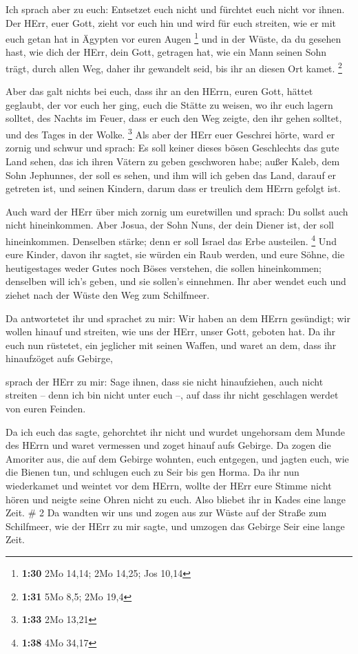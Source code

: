  Ich sprach aber zu euch: Entsetzet euch nicht und fürchtet
euch nicht vor ihnen.  Der HErr, euer Gott, zieht vor euch
hin und wird für euch streiten, wie er mit euch getan hat in Ägypten vor
euren Augen \footnote{\textbf{1:30} 2Mo 14,14; 2Mo 14,25; Jos 10,14}
 und in der Wüste, da du gesehen hast, wie dich der HErr,
dein Gott, getragen hat, wie ein Mann seinen Sohn trägt, durch allen
Weg, daher ihr gewandelt seid, bis ihr an diesen Ort kamet. \footnote{\textbf{1:31}
  5Mo 8,5; 2Mo 19,4}

 Aber das galt nichts bei euch, dass ihr an den HErrn,
euren Gott, hättet geglaubt,  der vor euch her ging, euch
die Stätte zu weisen, wo ihr euch lagern solltet, des Nachts im Feuer,
dass er euch den Weg zeigte, den ihr gehen solltet, und des Tages in der
Wolke. \footnote{\textbf{1:33} 2Mo 13,21}  Als aber der
HErr euer Geschrei hörte, ward er zornig und schwur und sprach:
 Es soll keiner dieses bösen Geschlechts das gute Land
sehen, das ich ihren Vätern zu geben geschworen habe; 
außer Kaleb, dem Sohn Jephunnes, der soll es sehen, und ihm will ich
geben das Land, darauf er getreten ist, und seinen Kindern, darum dass
er treulich dem HErrn gefolgt ist.

 Auch ward der HErr über mich zornig um euretwillen und
sprach: Du sollst auch nicht hineinkommen.  Aber Josua, der
Sohn Nuns, der dein Diener ist, der soll hineinkommen. Denselben stärke;
denn er soll Israel das Erbe austeilen. \footnote{\textbf{1:38} 4Mo
  34,17}  Und eure Kinder, davon ihr sagtet, sie würden ein
Raub werden, und eure Söhne, die heutigestages weder Gutes noch Böses
verstehen, die sollen hineinkommen; denselben will ich's geben, und sie
sollen's einnehmen.  Ihr aber wendet euch und ziehet nach
der Wüste den Weg zum Schilfmeer.

 Da antwortetet ihr und sprachet zu mir: Wir haben an dem
HErrn gesündigt; wir wollen hinauf und streiten, wie uns der HErr, unser
Gott, geboten hat. Da ihr euch nun rüstetet, ein jeglicher mit seinen
Waffen, und waret an dem, dass ihr hinaufzöget aufs Gebirge,

 sprach der HErr zu mir: Sage ihnen, dass sie nicht
hinaufziehen, auch nicht streiten -- denn ich bin nicht unter euch --,
auf dass ihr nicht geschlagen werdet von euren Feinden.

 Da ich euch das sagte, gehorchtet ihr nicht und wurdet
ungehorsam dem Munde des HErrn und waret vermessen und zoget hinauf aufs
Gebirge.  Da zogen die Amoriter aus, die auf dem Gebirge
wohnten, euch entgegen, und jagten euch, wie die Bienen tun, und
schlugen euch zu Seir bis gen Horma.  Da ihr nun
wiederkamet und weintet vor dem HErrn, wollte der HErr eure Stimme nicht
hören und neigte seine Ohren nicht zu euch.  Also bliebet
ihr in Kades eine lange Zeit. \# 2  Da wandten wir uns und
zogen aus zur Wüste auf der Straße zum Schilfmeer, wie der HErr zu mir
sagte, und umzogen das Gebirge Seir eine lange Zeit.

